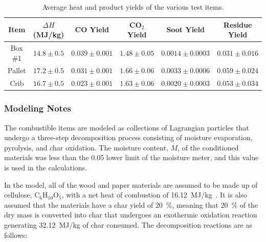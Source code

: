\begin{table}[h]
\caption[Average heat and product yields of the various test items]{Average heat and product yields of the various test items.}
\centering
\begin{tabular}{|c|c|c|c|c|c|}
\hline
Item        & $\Delta H$ (MJ/kg)  & CO Yield           & CO$_2$ Yield   & Soot Yield          & Residue Yield               \\ \hline \hline
Box \#1     & $14.8\pm0.5$        & $0.039\pm0.001$    & $1.48\pm0.05$  & $0.0014\pm0.0003$   & $0.031\pm0.016$               \\ \hline
Pallet      & $17.2\pm0.5$        & $0.031\pm0.001$    & $1.66\pm0.06$  & $0.0033\pm0.0006$   & $0.059\pm0.024$               \\ \hline
Crib        & $16.7\pm0.5$        & $0.023\pm0.001$    & $1.63\pm0.06$  & $0.0020\pm0.0003$   & $0.053\pm0.034$               \\ \hline
\end{tabular}
\label{Item_Yields}
\end{table}

\subsubsection{Modeling Notes}

The combustible items are modeled as collections of Lagrangian particles that undergo a three-step decomposition process consisting of moisture evaporation, pyrolysis, and char oxidation. The moisture content, $M$, of the conditioned materials was less than the 0.05 lower limit of the moisture meter, and this value is used in the calculations.

In the model, all of the wood and paper materials are assumed to be made up of cellulose, C$_6$H$_{10}$O$_5$, with a net heat of combustion of 16.12~MJ/kg~\cite{SFPE}. It is also assumed that the materials have a char yield of 20~\%, meaning that 20~\% of the dry mass is converted into char that undergoes an exothermic oxidation reaction generating 32.12~MJ/kg of char consumed. The decomposition reactions are as follows:

